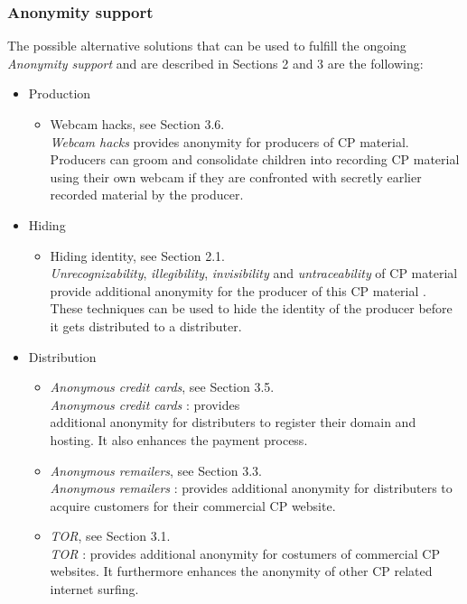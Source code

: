 \documentclass{sig-alternate-br}
\begin{document}
\subsubsection{Anonymity support}
The possible alternative solutions that can be used to fulfill the ongoing \textit{Anonymity support} and are described in Sections 2 and 3 are the following:
\begin{itemize}
	\item Production
		\begin{itemize}
			\item Webcam hacks, see Section 3.6.\\
				\textit{Webcam hacks} \cite{mishna2009ongoing,salomon2010examples} provides anonymity for producers of CP material. Producers can groom and consolidate children into recording CP material using their own webcam if they are confronted with secretly earlier recorded material by the producer.
		\end{itemize}
	\item Hiding
		\begin{itemize}
			\item Hiding identity, see Section 2.1.\\
				\textit{Unrecognizability}, \textit{illegibility}, \textit{invisibility} and \textit{untraceability} of CP material provide additional anonymity for the producer of this CP material \cite{en2011phishing}. These techniques can be used to hide the identity of the producer before it gets distributed to a distributer.
		\end{itemize}
	\item Distribution
		\begin{itemize}
			\item \textit{Anonymous credit cards}, see Section 3.5.\\
				\textit{Anonymous credit cards} \cite{wall2007cybercrime}: provides\\ additional anonymity for distributers to register their domain and hosting. It also enhances the payment process.
			\item \textit{Anonymous remailers}, see Section 3.3.\\
				\textit{Anonymous remailers} \cite{wall2007cybercrime}: provides additional anonymity for distributers to acquire customers for their commercial CP website.
			\item \textit{TOR}, see Section 3.1.\\
				\textit{TOR} \cite{dingledine2004tor}: provides additional anonymity for costumers of commercial CP websites. It furthermore enhances the anonymity of other CP related internet surfing.

\end{itemize}
\end{itemize}
\end{document}
